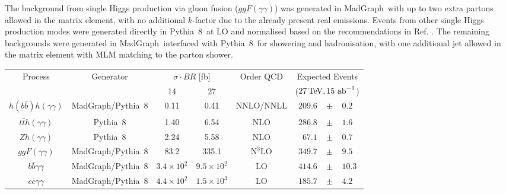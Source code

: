 The background from single Higgs production via gluon fusion ($ggF(\gamma\gamma)$) was generated in {\sc\small MadGraph}\ with up to two extra partons allowed in the matrix element, with no additional $k$-factor due to the already present real emissions. Events from other single Higgs production modes were generated directly in {\sc\small Pythia~8}\ at LO and normalised based on the recommendations in Ref. \cite{deFlorian:2016spz}. The remaining backgrounds were generated in {\sc\small MadGraph}\ interfaced with {\sc\small Pythia~8}\ for showering and hadronisation, with one additional jet allowed in the matrix element with MLM matching \cite{Mangano:2006rw, Alwall:2007fs} to the parton shower.

\begingroup
\renewcommand*{\arraystretch}{.7}
\begin{table}
\centering
\begin{tabular}{|c|c|cc|c|rcl|}
\hline
\multirow{2}{*}{Process}     & \multirow{2}{*}{Generator} & \multicolumn{2}{c|}{$\sigma \cdot BR$ {[}fb{]}} & \multirow{2}{*}{Order QCD} & \multicolumn{3}{c|}{Expected Events} \\
                              			&                   							& 14 \UTeV  			& 27 \UTeV  			&		& \multicolumn{3}{c|}{($27\, {\rm \text{TeV}}, 15~\text{ab}^{-1}$)} \\ \hline
$h(b\bar{b})h(\gamma\gamma)$  	& {\sc\small MadGraph}/{\sc\small Pythia~8} 	& 0.11      			& 0.41      			& NNLO/NNLL								& $209.6$		& $\pm$ & $0.2$ \\ \hline
$t\bar{t}h(\gamma\gamma)$     		& {\sc\small Pythia~8}           			& 1.40      			& 6.54      			& NLO  										& $286.8$		& $\pm$ & $1.6$\\
$Zh(\gamma\gamma)$            		& {\sc\small Pythia~8}           			& 2.24      			& 5.58      			& NLO 											& $67.1$ 		& $\pm$ & $0.7$ \\
$ggF(\gamma\gamma)$           		& {\sc\small MadGraph}/{\sc\small Pythia~8} 	& 83.2      			& 335.1     		& $\text{N}^{3}\text{LO}$ 				& $349.7$ 	& $\pm$ & $9.5$ \\ \hline
$b\bar{b}\gamma\gamma$        	& {\sc\small MadGraph}/{\sc\small Pythia~8} 	& $3.4\times 10^{2}$     & $9.5\times 10^{2}$     & LO 					& $414.6$ 	& $\pm$ & $10.3$ \\
$c\bar{c}\gamma\gamma$        		& {\sc\small MadGraph}/{\sc\small Pythia~8} 	& $4.4\times 10^{2}$     & $1.5\times 10^{3}$     & LO 					& $185.7$ 	& $\pm$ & $4.2$ \\

\end{tabular}
\end{table}
